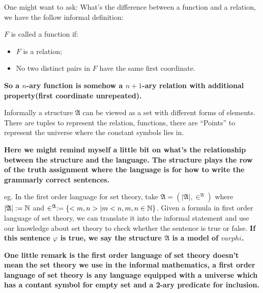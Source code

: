 \documentclass[11pt]{article}
\begin{document}
One might want to ask: What's the difference between a function and a relation, we have the follow informal definition:
\begin{definition}[Function]
\(F\) is called a function if:
\begin{itemize}
\item \(F\) is a relation;
\item No two distinct pairs in \(F\) have the same first coordinate.
\end{itemize}
\end{definition}

\textbf{So a \(n\)-ary function is somehow a \(n+1\)-ary relation with additional property(first coordinate unrepeated).}

Informally a structure \(\mathfrak{A}\) can be viewed as a set with different forms of elements. There are tuples to represent the relation, functions, there are ``Points'' to represent the universe where the constant symbols lies in.

\textbf{Here we might remind myself a little bit on what's the relationship between the structure and the language. The structure plays the row of the truth assignment where the language is for how to write the grammarly correct sentences.}

\begin{center}\end{center}

eg. In the first order language for set theory, take \(\mathfrak{A} = (\lvert\mathfrak{A}\rvert, \in^{\mathfrak{A}})\) where \(\lvert\mathfrak{A}\rvert:=\mathbb{N}\) and \(\in^{\mathfrak{A}}:=\{<m,n>| m < n, m,n \in \mathbb{N}\}\). Given a formula in first order language of set theory, we can translate it into the informal statement and use our knowledge about set theory to check whether the sentence is true or false. \textbf{If this sentence \(\varphi\) is true, we say the structure \(\mathfrak{A}\) is a model of \(varphi\).}

\textbf{One little remark is the first order language of set theory doesn't mean the set theory we use in the informal mathematics, a first order language of set theory is any language equipped with a universe which has a contant symbol for empty set and a 2-ary predicate for inclusion.}
\end{document}
